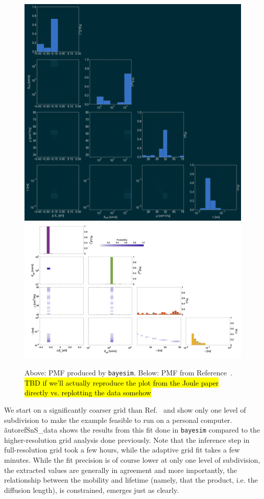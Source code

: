 \documentclass[aps,prl,amsmath,amssymb,superscriptaddress,notitlepage,groupedaddress]{revtex4-1}
\begin{document}
    \begin{figure}
      \includegraphics[width=0.7\columnwidth]{SnS_final_pmf.png}
      \includegraphics[width=0.8\columnwidth]{SnS_probs_Joule}
      \caption{Above: PMF produced by \texttt{bayesim}. Below: PMF from Reference~\cite{SnSJoule}. \hl{TBD if we'll actually reproduce the plot from the Joule paper directly vs. replotting the data somehow}}
      \label{SnS_data}
    \end{figure}

    We start on a significantly coarser grid than Ref.~\cite{SnSJoule} and show only one level of subdivision to make the example feasible to run on a personal computer. \~autoref{SnS_data} shows the results from this fit done in \texttt{bayesim} compared to the higher-resolution grid analysis done previously. Note that the inference step in full-resolution grid took a few hours, while the adaptive grid fit takes a few minutes. While the fit precision is of course lower at only one level of subdivision, the extracted values are generally in agreement and more importantly, the relationship between the mobility and lifetime (namely, that the product, i.e. the diffusion length), is constrained, emerges just as clearly.
\end{document}
